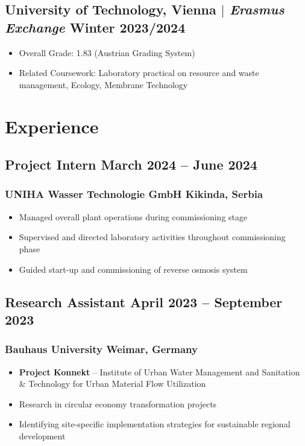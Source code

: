 \documentclass[11pt]{article} %
\begin{document}
\subsection{University of Technology, Vienna $|$ {\normalfont\itshape Erasmus Exchange} \hfill Winter 2023/2024}
\begin{itemize}
	\item Overall Grade: 1.83 (Austrian Grading System)
  	\item Related Coursework: Laboratory practical on resource and waste management, Ecology, Membrane Technology
\end{itemize}

\section{Experience}
\subsection{Project Intern \hfill March 2024 – June 2024}
\subsubsection{UNIHA Wasser Technologie GmbH \hfill Kikinda, Serbia}
\begin{itemize}
	\item Managed overall plant operations during commissioning stage
	\item Supervised and directed laboratory activities throughout commissioning phase
	\item Guided start-up and commissioning of reverse osmosis system
\end{itemize}

\subsection{Research Assistant \hfill April 2023 – September 2023}
\subsubsection{Bauhaus University \hfill Weimar, Germany}
\begin{itemize}
	\item \textbf{Project Konnekt} – Institute of Urban Water Management and Sanitation \& Technology for Urban Material Flow Utilization
	\item Research in circular economy transformation projects
	\item Identifying site-specific implementation strategies for sustainable regional development 
\end{itemize}
\end{document}
